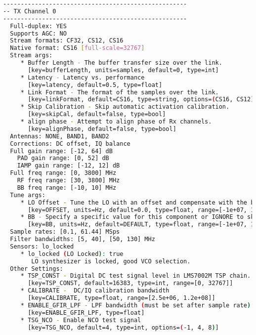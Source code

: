 \begin{appendices}
\begin{lstlisting}[language=bash, caption={SoapySDRUtil Probe Output for LimeSDR}, label={lst: soapyProbe}]
----------------------------------------------------
-- TX Channel 0
----------------------------------------------------
  Full-duplex: YES
  Supports AGC: NO
  Stream formats: CF32, CS12, CS16
  Native format: CS16 [full-scale=32767]
  Stream args:
     * Buffer Length - The buffer transfer size over the link.
       [key=bufferLength, units=samples, default=0, type=int]
     * Latency - Latency vs. performance
       [key=latency, default=0.5, type=float]
     * Link Format - The format of the samples over the link.
       [key=linkFormat, default=CS16, type=string, options=(CS16, CS12)]
     * Skip Calibration - Skip automatic activation calibration.
       [key=skipCal, default=false, type=bool]
     * align phase - Attempt to align phase of Rx channels.
       [key=alignPhase, default=false, type=bool]
  Antennas: NONE, BAND1, BAND2
  Corrections: DC offset, IQ balance
  Full gain range: [-12, 64] dB
    PAD gain range: [0, 52] dB
    IAMP gain range: [-12, 12] dB
  Full freq range: [0, 3800] MHz
    RF freq range: [30, 3800] MHz
    BB freq range: [-10, 10] MHz
  Tune args:
     * LO Offset - Tune the LO with an offset and compensate with the baseband CORDIC.
       [key=OFFSET, units=Hz, default=0.0, type=float, range=[-1e+07, 1e+07]]
     * BB - Specify a specific value for this component or IGNORE to skip tuning it.
       [key=BB, units=Hz, default=DEFAULT, type=float, range=[-1e+07, 1e+07], options=(DEFAULT, IGNORE)]
  Sample rates: [0.1, 61.44] MSps
  Filter bandwidths: [5, 40], [50, 130] MHz
  Sensors: lo_locked
     * lo_locked (LO Locked): true
        LO synthesizer is locked, good VCO selection.
  Other Settings:
     * TSP_CONST - Digital DC test signal level in LMS7002M TSP chain.
       [key=TSP_CONST, default=16383, type=int, range=[0, 32767]]
     * CALIBRATE -  DC/IQ calibration bandwidth
       [key=CALIBRATE, type=float, range=[2.5e+06, 1.2e+08]]
     * ENABLE_GFIR_LPF - LPF bandwidth (must be set after sample rate)
       [key=ENABLE_GFIR_LPF, type=float]
     * TSG_NCO - Enable NCO test signal
       [key=TSG_NCO, default=4, type=int, options=(-1, 4, 8)]


\end{lstlisting}
\end{appendices}
